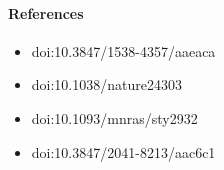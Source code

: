 \documentclass[11pt]{article}
\begin{document}
\paragraph{References}
\begin{itemize}\raggedright
\item doi:10.3847/\allowbreak{}1538-4357/\allowbreak{}aaeaca
\item doi:10.1038/\allowbreak{}nature24303
\item doi:10.1093/\allowbreak{}mnras/\allowbreak{}sty2932
\item doi:10.3847/\allowbreak{}2041-8213/\allowbreak{}aac6c1
\end{itemize}
\end{document}
